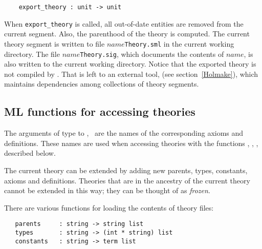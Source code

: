 \begin{boxed}
\begin{verbatim}
    export_theory : unit -> unit
\end{verbatim}
\end{boxed}

When {\small\verb+export_theory+} is called, all out-of-date entities
are removed from the current segment. Also, the parenthood of the
theory is computed. The current theory segment is written to file
$name${\small{\tt Theory.sml}} in the current working directory.  The
file $name${\small{\tt Theory.sig}}, which documents the contents of
$name$, is also written to the current working directory.  Notice that
the exported theory is not compiled by \HOL. That is left to an
external tool, \holmake{} (see section~\ref{Holmake}), which maintains
dependencies among collections of \HOL{} theory segments.


\subsection{ML functions for accessing theories}

%
The arguments of \ML{} type  to ,
 \etc\ are the names of the corresponding axioms
and definitions. These names are used when accessing theories with the
functions , , \etc, described below.

The current theory
%
%
can be extended by adding new parents, types, constants, axioms and
definitions. Theories that are in the ancestry of the current theory
cannot be extended in this way; they can be thought of as
\emph{frozen}.

There are various functions for loading the contents of theory files:

\begin{boxed}
\begin{verbatim}
   parents     : string -> string list
   types       : string -> (int * string) list
   constants   : string -> term list
\end{verbatim}
\end{boxed}

